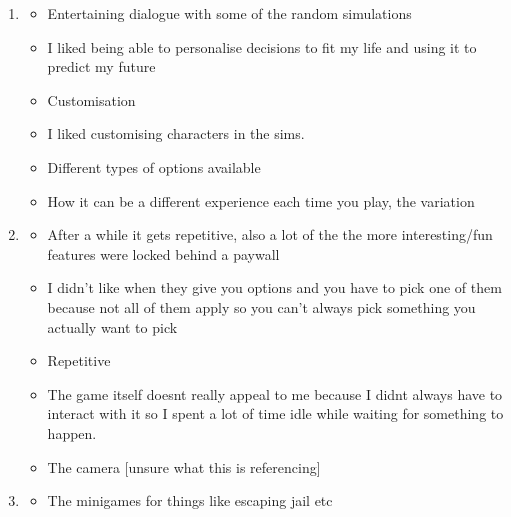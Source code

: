 \begin{enumerate}
\begin{enumerate}
\begin{itemize}
            \item Lost interest as it started to get repetitive
            \item Glitches in software and ads
            \item Boredom/Repetitive
            \item I didn\textquotesingle t find them very interesting.
            \item The time needed for waiting
            \item Boredom
        \end{itemize}
        \item 
        \begin{itemize}
            \item Entertaining dialogue with some of the random simulations
            \item I liked being able to personalise decisions to fit my life and using it to predict my future
            \item Customisation
            \item I liked customising characters in the sims.
            \item Different types of options available
            \item How it can be a different experience each time you play, the variation
        \end{itemize}
        \item
        \begin{itemize}
            \item After a while it gets repetitive, also a lot of the the more interesting/fun features were locked behind a paywall
            \item I didn’t like when they give you options and you have to pick one of them because not all of them apply so you can’t always pick something you actually want to pick
            \item Repetitive
            \item The game itself doesn\textquotesingle t really appeal to me because I didn\textquotesingle t always have to interact with it so I spent a lot of time idle while waiting for something to happen.
            \item The camera [unsure what this is referencing]
        \end{itemize}
        \item
        \begin{itemize}
            \item The minigames for things like escaping jail etc

\end{itemize}
\end{enumerate}
\end{enumerate}
